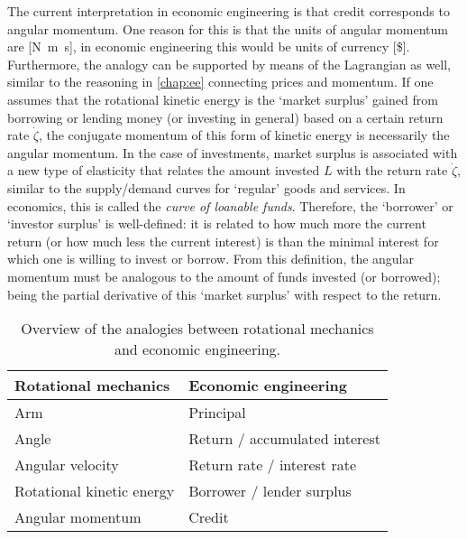 The current interpretation in economic engineering is that credit corresponds to angular momentum. One reason for this is that the units of angular momentum are [\si{\newton \meter \second}], in economic engineering this would be units of currency [\$]. Furthermore, the analogy can be supported by means of the Lagrangian as well, similar to the reasoning in \cref{chap:ee} connecting prices and momentum. If one assumes that the rotational kinetic energy is the `market surplus' gained from borrowing or lending money (or investing in general) based on a certain return rate $\dot{\zeta}$, the conjugate momentum of this form of kinetic energy is necessarily the angular momentum. In the case of investments, market surplus is associated with a new type of elasticity that relates the amount invested $L$ with the return rate $\dot{\zeta}$, similar to the supply/demand curves for `regular' goods and services. In economics, this is called the \emph{curve of loanable funds}. Therefore, the `borrower' or `investor surplus' is well-defined: it is related to how much more the current return (or how much less the current interest) is than the minimal interest for which one is willing to invest or borrow. From this definition, the angular momentum must be analogous to the amount of funds invested (or borrowed); being the partial derivative of this `market surplus' with respect to the return. 
\begin{table}[h]
    \centering
    \caption{Overview of the analogies between rotational mechanics and economic engineering.}
    \begin{tabular}{ll}
        \toprule
         \textbf{Rotational mechanics} & \textbf{Economic engineering} \\
         \midrule
         Arm & Principal \\
         Angle & Return / accumulated interest \\
         Angular velocity & Return rate / interest rate \\
         Rotational kinetic energy & Borrower / lender surplus \\
         Angular momentum & Credit \\
         \bottomrule
    \end{tabular}
    \label{tab:my_label}
\end{table}

